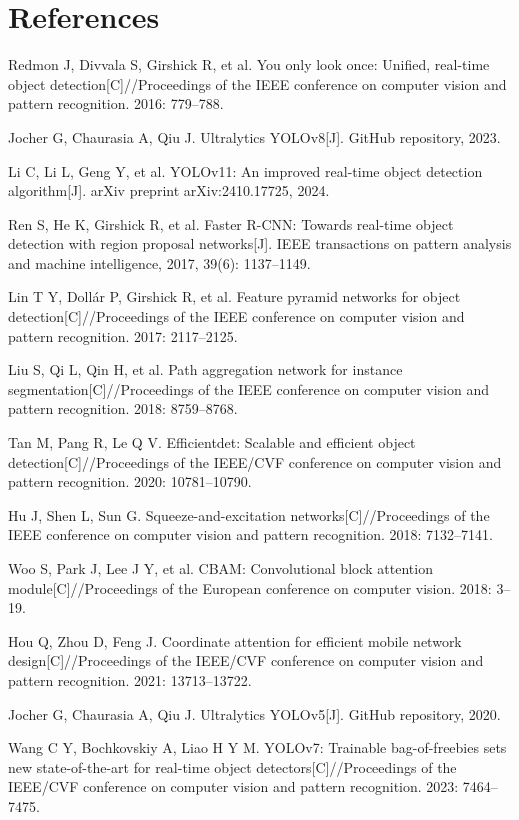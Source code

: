 \documentclass[12pt,a4paper]{article}
\begin{document}
\section*{References}

\begin{enumerate}[label={[\arabic*]}, noitemsep]
  \item Redmon J, Divvala S, Girshick R, et al. You only look once: Unified, real-time object detection[C]//Proceedings of the IEEE conference on computer vision and pattern recognition. 2016: 779--788.
  \item Jocher G, Chaurasia A, Qiu J. Ultralytics YOLOv8[J]. GitHub repository, 2023.
  \item Li C, Li L, Geng Y, et al. YOLOv11: An improved real-time object detection algorithm[J]. arXiv preprint arXiv:2410.17725, 2024.
  \item Ren S, He K, Girshick R, et al. Faster R-CNN: Towards real-time object detection with region proposal networks[J]. IEEE transactions on pattern analysis and machine intelligence, 2017, 39(6): 1137--1149.
  \item Lin T Y, Dollár P, Girshick R, et al. Feature pyramid networks for object detection[C]//Proceedings of the IEEE conference on computer vision and pattern recognition. 2017: 2117--2125.
  \item Liu S, Qi L, Qin H, et al. Path aggregation network for instance segmentation[C]//Proceedings of the IEEE conference on computer vision and pattern recognition. 2018: 8759--8768.
  \item Tan M, Pang R, Le Q V. Efficientdet: Scalable and efficient object detection[C]//Proceedings of the IEEE/CVF conference on computer vision and pattern recognition. 2020: 10781--10790.
  \item Hu J, Shen L, Sun G. Squeeze-and-excitation networks[C]//Proceedings of the IEEE conference on computer vision and pattern recognition. 2018: 7132--7141.
  \item Woo S, Park J, Lee J Y, et al. CBAM: Convolutional block attention module[C]//Proceedings of the European conference on computer vision. 2018: 3--19.
  \item Hou Q, Zhou D, Feng J. Coordinate attention for efficient mobile network design[C]//Proceedings of the IEEE/CVF conference on computer vision and pattern recognition. 2021: 13713--13722.
  \item Jocher G, Chaurasia A, Qiu J. Ultralytics YOLOv5[J]. GitHub repository, 2020.
  \item Wang C Y, Bochkovskiy A, Liao H Y M. YOLOv7: Trainable bag-of-freebies sets new state-of-the-art for real-time object detectors[C]//Proceedings of the IEEE/CVF conference on computer vision and pattern recognition. 2023: 7464--7475.
\end{enumerate}
\end{document}
